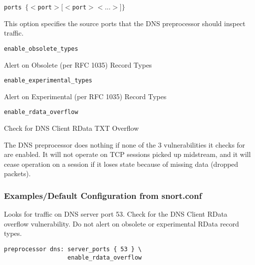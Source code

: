 \documentclass[english]{report}
\newcounter{slistnum}
\newenvironment{slist}
{ \begin{list}{ {\bf \arabic{slistnum}.} }{\usecounter{slistnum} } }
{ \end{list} }
\begin{document}
\begin{slist}

\item \texttt{ports $\{ <$port$> [<$port$> <...>] \}$}

This option specifies the source ports that the DNS preprocessor should
inspect traffic.

\item \texttt{enable\_obsolete\_types}

Alert on Obsolete (per RFC 1035) Record Types

\item \texttt{enable\_experimental\_types}

Alert on Experimental (per RFC 1035) Record Types

\item \texttt{enable\_rdata\_overflow}

Check for DNS Client RData TXT Overflow

\end{slist}

The DNS preprocessor does nothing if none of the 3 vulnerabilities
it checks for are enabled.  It will not operate on TCP sessions
picked up midstream, and it will cease operation on a session if it
loses state because of missing data (dropped packets).

\subsubsection{Examples/Default Configuration from snort.conf}

Looks for traffic on DNS server port 53.  Check for the DNS Client RData
overflow vulnerability.  Do not alert on obsolete or experimental RData
record types.

\begin{verbatim}
preprocessor dns: server_ports { 53 } \
                  enable_rdata_overflow
\end{verbatim}
\end{document}
